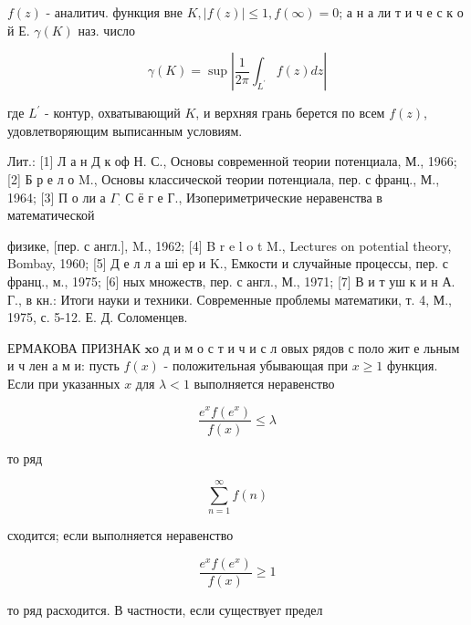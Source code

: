 \documentclass[10pt]{article}
\begin{document}
$f(z)$ - аналитич. функция вне $K,|f(z)| \leqslant 1, f(\infty)=0$; а н а ли т и ч е с к о й Е. $\gamma(K)$ наз. число



\[

\gamma(K)=\sup \left|\frac{1}{2 \pi} \int_{L^{\prime}} f(z) d z\right|

\]



где $L^{\prime}$ - контур, охватывающий $K$, и верхняя грань берется по всем $f(z)$, удовлетворяющим выписанным условиям.



Лит.: [1] Л а н Д к оф Н. С., Основы современной теории потенциала, М., 1966; [2] Б р е л о M., Основы классической теории потенциала, пер. с франц., М., 1964; [3] П о ли а $\Gamma_{.}$ С ё г е Г., Изопериметрические неравенства в математической

физике, [пер. с англ.], M., 1962; [4] B r e l o t M., Lectures on potential theory, Bombay, 1960; [5] Д е л л а ші ер и K., Емкости и случайные процессы, пер. с франц., м., 1975; [6] ных множеств, пер. с англ., М., 1971; [7] В и т уш к и н А. Г., в кн.: Итоги науки и техники. Современные проблемы математики, т. 4, М., 1975, с. 5-12. Е. Д. Соломенцев.



ЕРМАКОВА ПРИЗНАК $\mathbf{x} о$ д и м о с т и ч и с л овых рядов с поло жит е льным и ч лен а м и: пусть $f(x)$ - положительная убывающая при $x \geqslant 1$ функция. Если при указанных $x$ для $\lambda<1$ выполняется неравенство



\[

\frac{e^{x} f\left(e^{x}\right)}{f(x)} \leq \lambda

\]



то ряд



\[

\sum_{n=1}^{\infty} f(n)

\]



сходится; если выполняется неравенство



\[

\frac{e^{x} f\left(e^{x}\right)}{f(x)} \geqslant 1

\]



то ряд расходится. В частности, если существует предел
\end{document}
